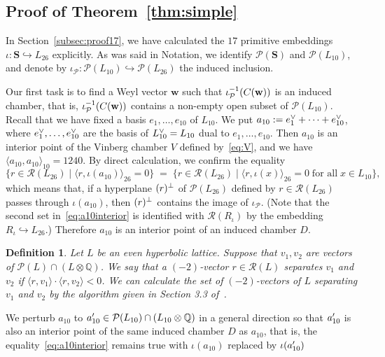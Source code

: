 \documentclass{amsart}
\newtheorem{_definition}[theorem]{Definition}
\newenvironment{definition}{\begin{_definition}\rm}{\end{_definition}}
\numberwithin{equation}{section}
\numberwithin{table}{section}
\numberwithin{figure}{section}
\newcommand{\Q}{\mathord{\mathbb  Q}}
\newcommand{\PPP}{\mathord{\mathcal P}}
\newcommand{\RRR}{\mathord{\mathcal R}}
\newcommand{\inj}{\hookrightarrow}
\newcommand{\shortset}[2]{\{ {#1} \mid  {#2}   \}}
\newcommand{\tensor}{\otimes}
\newcommand{\sprime}{\sp\prime}
\newcommand{\sperp}{\sp{\perp}}
\newcommand{\dual}{\sp{\vee}}
\newcommand{\inv}{\sp{-1}}
\newcommand{\weyl}{\mathord{\mathbf w}}
\newcommand{\intf}[1]{\langle #1 \rangle}
\newcommand{\intfL}[1]{\langle #1\rangle_{10}}
\newcommand{\intfLL}[1]{\langle #1\rangle_{26}}
\renewcommand{\SS}{\mathbf{S}}
\begin{document}
\subsection{Proof of Theorem~\ref{thm:simple}}\label{subsec:proofsimple}
%
In Section~\ref{subsec:proof17}, we have calculated the $17$ primitive embeddings
$\iota\colon \SS\inj L_{26}$ explicitly.
As was said in Notation, we identify $\PPP(\SS)$ and $\PPP(L_{10})$, and
denote by
$\iota_{\PPP}\colon \PPP(L_{10})\inj \PPP(L_{26})$
the induced inclusion.
\par
Our first task is to find a Weyl vector $\weyl$
such that $\iota_{\PPP}\inv (C(\weyl))$ is an induced chamber,
that is, $\iota_{\PPP}\inv  (C(\weyl))$ contains a non-empty open subset of $\PPP(L_{10})$.
Recall that we have fixed a basis $e_1, \dots, e_{10}$ of $L_{10}$.
We put
$a_{10}:=e_1\dual+\cdots+e_{10}\dual$,
where $e_1\dual, \dots, e_{10}\dual$
are the basis of $L_{10}\dual=L_{10}$ dual to $e_1, \dots, e_{10}$.
Then $a_{10}$ is an interior point of the Vinberg chamber $V$ defined by~\eqref{eq:V},
and we have $\intfL{a_{10}, a_{10}}=1240$.
By direct calculation, we confirm the equality
%
\begin{equation}\label{eq:a10interior}
\shortset{r\in \RRR(L_{26})}{ \intfLL{r, \iota(a_{10})}=0}
\;=\;
\shortset{r\in \RRR(L_{26})}{ \intfLL{r, \iota(x)}=0 \;\textrm{for all}\; x\in L_{10}},
\end{equation}
%
which means that, if  a hyperplane $(r)\sperp$ of $\PPP(L_{26})$ defined by $r\in \RRR(L_{26})$
passes through $\iota(a_{10})$, then $(r)\sperp$ contains the image of $\iota_{\PPP}$.
(Note that the second set in~\eqref{eq:a10interior} is identified with $\RRR(R_{\iota})$ by
the embedding $R_{\iota}\inj L_{26}$.)
Therefore $a_{10}$ is an interior point of an induced chamber $D$.
%
\begin{definition}
Let $L$ be an even hyperbolic lattice.
Suppose that $v_1, v_2$ are vectors of $\PPP(L)\cap (L\tensor \Q)$.
We say that a $(-2)$-vector $r\in \RRR(L)$
\emph{separates} $v_1$ and $v_2$ if $\intf{r, v_1}\cdot \intf{r, v_2}<0$.
We can calculate the set
of $(-2)$-vectors of $L$ separating $v_1$ and $v_2$
by the algorithm given in Section 3.3 of~\cite{ShimadaChar5}.
\end{definition}
%
We perturb $a_{10}$ to $a_{10}\sprime\in \PPP(L_{10})\cap (L_{10}\tensor\Q)$
in a general direction
so that $a_{10}\sprime$ is also an interior
point of the same induced chamber $D$ as  $a_{10}$,
that is, the equality~\eqref{eq:a10interior} remains true with
$\iota(a_{10})$ replaced by $\iota(a_{10}\sprime)$
\end{document}
